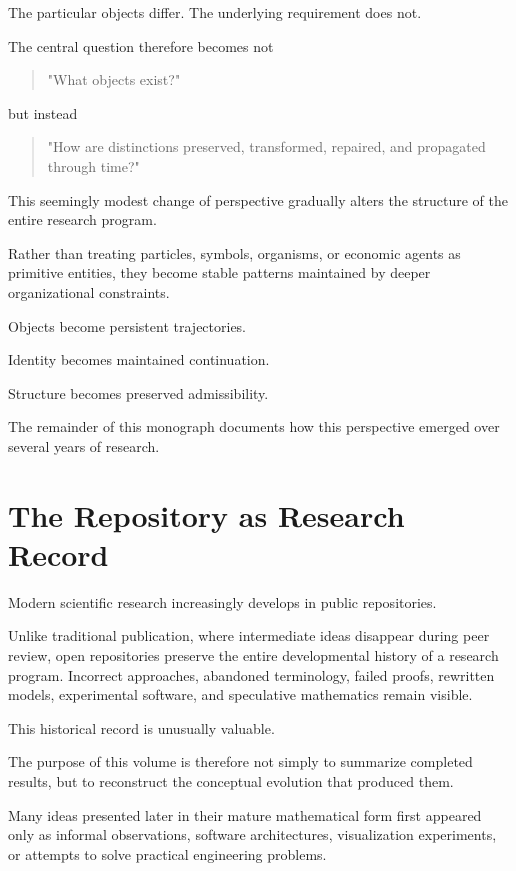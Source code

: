 \documentclass[11pt,oneside]{book}
\numberwithin{equation}{chapter}
\theoremstyle{definition}
\theoremstyle{plain}
\begin{document}
The particular objects differ. The underlying requirement does not.

The central question therefore becomes not

\begin{quote}
"What objects exist?"
\end{quote}

but instead

\begin{quote}
"How are distinctions preserved, transformed, repaired, and propagated
through time?"
\end{quote}

This seemingly modest change of perspective gradually alters the structure of
the entire research program.

Rather than treating particles, symbols, organisms, or economic agents as
primitive entities, they become stable patterns maintained by deeper
organizational constraints.

Objects become persistent trajectories.

Identity becomes maintained continuation.

Structure becomes preserved admissibility.

The remainder of this monograph documents how this perspective emerged over
several years of research.

\section{The Repository as Research Record}

Modern scientific research increasingly develops in public repositories.

Unlike traditional publication, where intermediate ideas disappear during
peer review, open repositories preserve the entire developmental history of
a research program. Incorrect approaches, abandoned terminology, failed
proofs, rewritten models, experimental software, and speculative
mathematics remain visible.

This historical record is unusually valuable.

The purpose of this volume is therefore not simply to summarize completed
results, but to reconstruct the conceptual evolution that produced them.

Many ideas presented later in their mature mathematical form first appeared
only as informal observations, software architectures, visualization
experiments, or attempts to solve practical engineering problems.
\end{document}
